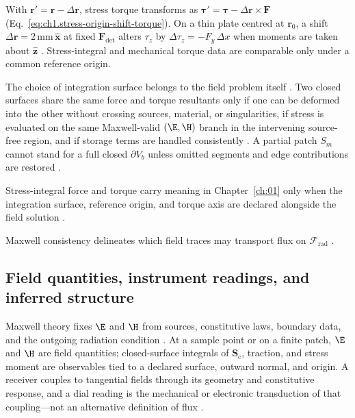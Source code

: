 \begin{example}
\label{ex:ch1.origin-shift}
With $\mathbf{r}'=\mathbf{r}-\Delta\mathbf{r}$, stress torque transforms as $\boldsymbol{\tau}'=\boldsymbol{\tau}-\Delta\mathbf{r}\times\mathbf{F}$ (Eq.~\eqref{eq:ch1.stress-origin-shift-torque}). On a thin plate centred at $\mathbf{r}_0$, a shift $\Delta\mathbf{r}=2\,\mathrm{mm}\,\hat{\mathbf{x}}$ at fixed $\mathbf{F}_{\mathrm{det}}$ alters $\tau_z$ by $\Delta\tau_z=-F_y\,\Delta x$ when moments are taken about $\hat{\mathbf{z}}$ \cite{stratton1941}. Stress-integral and mechanical torque data are comparable only under a common reference origin.
\end{example}

The choice of integration surface belongs to the field problem itself \cite{stratton1941}. Two closed surfaces share the same force and torque resultants only if one can be deformed into the other without crossing sources, material, or singularities, if stress is evaluated on the same Maxwell-valid $(\E,\H)$ branch in the intervening source-free region, and if storage terms are handled consistently \cite{maxwell1873,stratton1941}. A partial patch $S_m$ cannot stand for a full closed $\partial V_b$ unless omitted segments and edge contributions are restored \cite{stratton1941}.

\label{prop:ch1.stress-torque-admissibility}
Stress-integral force and torque carry meaning in Chapter~\ref{ch:01} only when the integration surface, reference origin, and torque axis are declared alongside the field solution \cite{stratton1941,beth1936}.

Maxwell consistency delineates which field traces may transport flux on $\mathcal{F}_{\mathrm{rad}}$ \cite{stratton1941}.
\subsection{Field quantities, instrument readings, and inferred structure}
\label{sec:ch01.5.3}

Maxwell theory fixes $\E$ and $\H$ from sources, constitutive laws, boundary data, and the outgoing radiation condition \cite{maxwell1873,stratton1941}. At a sample point or on a finite patch, $\E$ and $\H$ are field quantities; closed-surface integrals of $\mathbf{S}_\mathrm{c}$, traction, and stress moment are observables tied to a declared surface, outward normal, and origin. A receiver couples to tangential fields through its geometry and constitutive response, and a dial reading is the mechanical or electronic transduction of that coupling---not an alternative definition of flux \cite{poynting1884,beth1936}.

